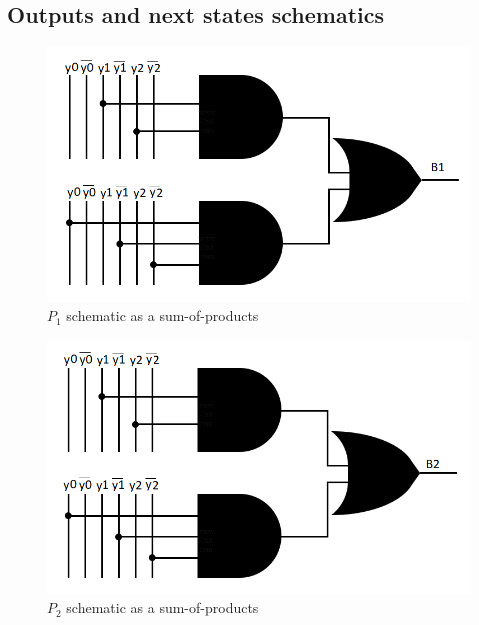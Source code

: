 \documentclass[../../e3_tp3_main.tex]{subfiles}
\begin{document}
\subsection{Outputs and next states schematics}
\begin{figure}[H]
	\centering
	\includegraphics{figures/moore_B1_schem.PNG}
	\caption{$P_1$ schematic as a sum-of-products}
	\label{fig:ej1_moore_P1_schem}
\end{figure}
\begin{figure}[H]
	\centering
	\includegraphics[scale=1]{figures/moore_B2_schem.PNG}
	\caption{$P_2$ schematic as a sum-of-products}
	\label{fig:ej1_moore_P2_schem}
\end{figure}
\end{document}
